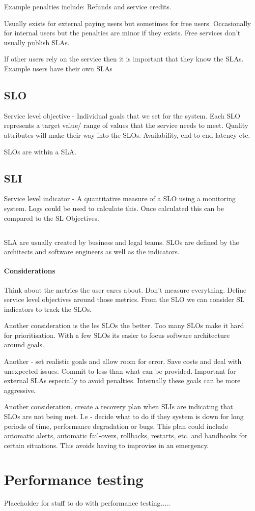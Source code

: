 Example penalties include: Refunds and service credits.

Usually exists for external paying users but sometimes for free users.
Occasionally for internal users but the penalties are minor if they exists.
Free services don't usually publish SLAs.

If other users rely on the service then it is important that they know the SLAs.
Example users have their own SLAs

\subsection{SLO}
Service level objective - Individual goals that we set for the system.
Each SLO represents a target value/ range of values that the service needs to meet.
Quality attributes will make their way into the SLOs. Availability, end to end latency etc.

SLOs are within a SLA.

\subsection{SLI}
Service level indicator - A quantitative measure of a SLO using a monitoring system. Logs could be used to calculate this.
Once calculated this can be compared to the SL Objectives.

\subsection{}
SLA are usually created by business and legal teams.
SLOs are defined by the architects and software engineers as well as the indicators.

\paragraph{Considerations}
Think about the metrics the user cares about.
Don't measure everything.
Define service level objectives around those metrics.
From the SLO we can consider SL indicators to track the SLOs.

Another consideration is the les SLOs the better.
Too many SLOs make it hard for prioritisation.
With a few SLOs its easier to focus software architecture around goals.

Another - set realistic goals and allow room for error.
Save costs and deal with unexpected issues.
Commit to less than what can be provided.
Important for external SLAs especially to avoid penalties.
Internally these goals can be more aggressive.

Another consideration, create a recovery plan when SLIs are indicating that SLOs are not being met.
I.e - decide what to do if they system is down for long periods of time, performance degradation or bugs.
This plan could include automatic alerts, automatic fail-overs, rollbacks, restarts, etc.
and handbooks for certain situations.
This avoids having to improvise in an emergency.


\section{Performance testing}
Placeholder for stuff to do with performance testing.....